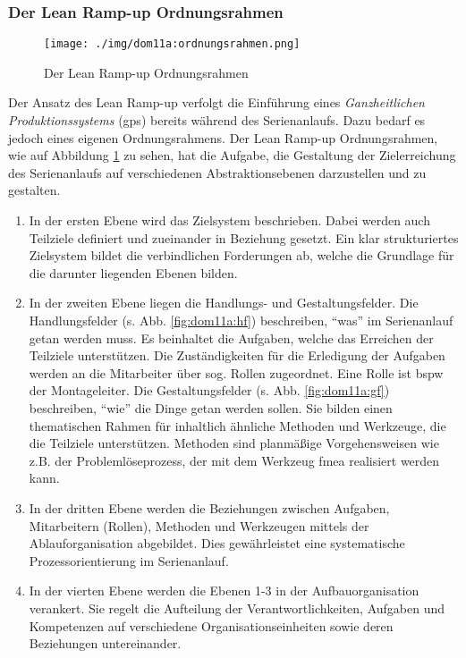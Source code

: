 \subsubsection{Der Lean Ramp-up Ordnungsrahmen}\label{sec:dom11a:ordnungsrahmen}
\begin{figure}[ht]
 \centering
 \texttt{[image: ./img/dom11a:ordnungsrahmen.png]}
 \caption[Der Lean Ramp-up Ordnungsrahmen]{Der Lean Ramp-up Ordnungsrahmen \autocite{Dombrowski2011a}}
 \label{fig:dom11a:ordnungsrahmen}
\end{figure}

Der Ansatz des Lean Ramp-up verfolgt die Einführung eines \textit{Ganzheitlichen Produktionssystems} (\gls{gps}) bereits während des Serienanlaufs. Dazu bedarf es jedoch eines eigenen Ordnungsrahmens. Der Lean Ramp-up Ordnungsrahmen, wie auf Abbildung \ref{fig:dom11a:ordnungsrahmen} zu sehen, hat die Aufgabe, die Gestaltung der Zielerreichung des Serienanlaufs auf verschiedenen Abstraktionsebenen darzustellen und zu gestalten. 

\begin{enumerate}
 \item In der ersten Ebene wird das Zielsystem beschrieben. Dabei werden auch Teilziele definiert und zueinander in Beziehung gesetzt. Ein klar strukturiertes Zielsystem bildet die verbindlichen Forderungen ab, welche die Grundlage für die darunter liegenden Ebenen bilden. 
\item In der zweiten Ebene liegen die Handlungs- und Gestaltungsfelder. Die Handlungsfelder (s. Abb. \ref{fig:dom11a:hf}) beschreiben, ``was'' im Serienanlauf getan werden muss. Es beinhaltet die Aufgaben, welche das Erreichen der Teilziele unterstützen. Die Zuständigkeiten für die Erledigung der Aufgaben werden an die Mitarbeiter über sog. Rollen zugeordnet. Eine Rolle ist \gls{bspw} der Montageleiter. 
Die Gestaltungsfelder (s. Abb. \ref{fig:dom11a:gf}) beschreiben, ``wie'' die Dinge getan werden sollen. Sie bilden einen thematischen Rahmen für inhaltlich ähnliche Methoden und Werkzeuge, die die Teilziele unterstützen. Methoden sind planmäßige Vorgehensweisen wie z.B. der Problemlöseprozess, der mit dem Werkzeug \gls{fmea}
realisiert werden kann.  

\item In der dritten Ebene werden die Beziehungen zwischen Aufgaben, Mitarbeitern (Rollen), Methoden und Werkzeugen mittels der Ablauforganisation abgebildet. Dies gewährleistet eine systematische Prozessorientierung im Serienanlauf. 

\item In der vierten Ebene werden die Ebenen 1-3 in der Aufbauorganisation verankert. Sie regelt die Aufteilung der Verantwortlichkeiten, Aufgaben und Kompetenzen auf verschiedene Organisationseinheiten sowie deren Beziehungen untereinander. 
\end{enumerate}


